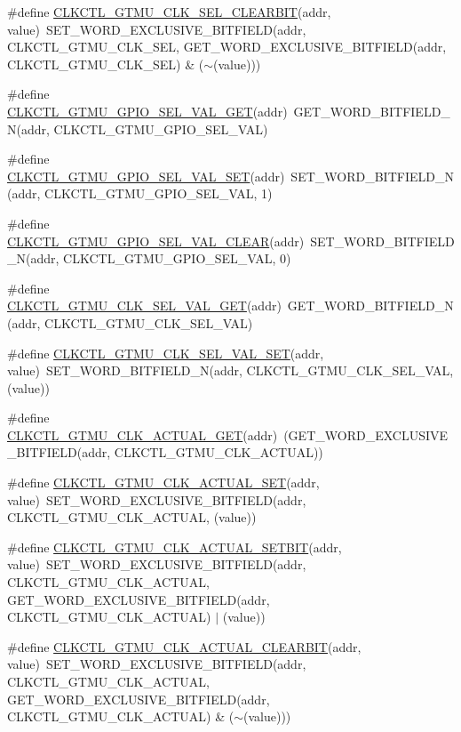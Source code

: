 \begin{DoxyCompactItemize}
\item 
\#define \hyperlink{a00544_acdc14a87376c0164840b9a9f7e875620}{CLKCTL\_\-GTMU\_\-CLK\_\-SEL\_\-CLEARBIT}(addr, value)~SET\_\-WORD\_\-EXCLUSIVE\_\-BITFIELD(addr, CLKCTL\_\-GTMU\_\-CLK\_\-SEL, GET\_\-WORD\_\-EXCLUSIVE\_\-BITFIELD(addr, CLKCTL\_\-GTMU\_\-CLK\_\-SEL) \& ($\sim$(value)))
\item 
\#define \hyperlink{a00544_a717bfeece3a5832caa4fbfb549d2f371}{CLKCTL\_\-GTMU\_\-GPIO\_\-SEL\_\-VAL\_\-GET}(addr)~GET\_\-WORD\_\-BITFIELD\_\-N(addr, CLKCTL\_\-GTMU\_\-GPIO\_\-SEL\_\-VAL)
\item 
\#define \hyperlink{a00544_aa13d73aa507701c6ea64b1b7d1f6544d}{CLKCTL\_\-GTMU\_\-GPIO\_\-SEL\_\-VAL\_\-SET}(addr)~SET\_\-WORD\_\-BITFIELD\_\-N(addr, CLKCTL\_\-GTMU\_\-GPIO\_\-SEL\_\-VAL, 1)
\item 
\#define \hyperlink{a00544_ad61fbe9ed4175bff26c797decf243baf}{CLKCTL\_\-GTMU\_\-GPIO\_\-SEL\_\-VAL\_\-CLEAR}(addr)~SET\_\-WORD\_\-BITFIELD\_\-N(addr, CLKCTL\_\-GTMU\_\-GPIO\_\-SEL\_\-VAL, 0)
\item 
\#define \hyperlink{a00544_afe47dff47fc4246cdb60ec9cc93fa5f4}{CLKCTL\_\-GTMU\_\-CLK\_\-SEL\_\-VAL\_\-GET}(addr)~GET\_\-WORD\_\-BITFIELD\_\-N(addr, CLKCTL\_\-GTMU\_\-CLK\_\-SEL\_\-VAL)
\item 
\#define \hyperlink{a00544_a0221704863f754489c4b7a95a3dab5c3}{CLKCTL\_\-GTMU\_\-CLK\_\-SEL\_\-VAL\_\-SET}(addr, value)~SET\_\-WORD\_\-BITFIELD\_\-N(addr, CLKCTL\_\-GTMU\_\-CLK\_\-SEL\_\-VAL, (value))
\item 
\#define \hyperlink{a00544_ae3b0e9d678adbba2a3fa17c36981cb26}{CLKCTL\_\-GTMU\_\-CLK\_\-ACTUAL\_\-GET}(addr)~(GET\_\-WORD\_\-EXCLUSIVE\_\-BITFIELD(addr, CLKCTL\_\-GTMU\_\-CLK\_\-ACTUAL))
\item 
\#define \hyperlink{a00544_a1ebc01cf0417b5e097daf905cb9102ec}{CLKCTL\_\-GTMU\_\-CLK\_\-ACTUAL\_\-SET}(addr, value)~SET\_\-WORD\_\-EXCLUSIVE\_\-BITFIELD(addr, CLKCTL\_\-GTMU\_\-CLK\_\-ACTUAL, (value))
\item 
\#define \hyperlink{a00544_a8b743e2d3bcb5c3045e8c96d7b2902d6}{CLKCTL\_\-GTMU\_\-CLK\_\-ACTUAL\_\-SETBIT}(addr, value)~SET\_\-WORD\_\-EXCLUSIVE\_\-BITFIELD(addr, CLKCTL\_\-GTMU\_\-CLK\_\-ACTUAL, GET\_\-WORD\_\-EXCLUSIVE\_\-BITFIELD(addr, CLKCTL\_\-GTMU\_\-CLK\_\-ACTUAL) $|$ (value))
\item 
\#define \hyperlink{a00544_a6980ae01b36ae1a28a4d21a6086397a2}{CLKCTL\_\-GTMU\_\-CLK\_\-ACTUAL\_\-CLEARBIT}(addr, value)~SET\_\-WORD\_\-EXCLUSIVE\_\-BITFIELD(addr, CLKCTL\_\-GTMU\_\-CLK\_\-ACTUAL, GET\_\-WORD\_\-EXCLUSIVE\_\-BITFIELD(addr, CLKCTL\_\-GTMU\_\-CLK\_\-ACTUAL) \& ($\sim$(value)))

\end{DoxyCompactItemize}
